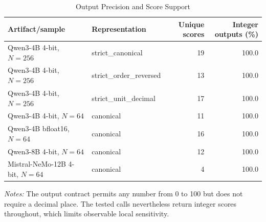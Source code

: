 \begin{table}[!htbp]\centering
\caption{Output Precision and Score Support}\label{tab:a_precision}
\begin{tabular}{llrr}\toprule
Artifact/sample & Representation & Unique scores & Integer outputs (\%) \\
\midrule
Qwen3-4B 4-bit, $N=256$ & strict\_canonical & 19 & 100.0 \\
Qwen3-4B 4-bit, $N=256$ & strict\_order\_reversed & 13 & 100.0 \\
Qwen3-4B 4-bit, $N=256$ & strict\_unit\_decimal & 17 & 100.0 \\
Qwen3-4B 4-bit, $N=64$ & canonical & 11 & 100.0 \\
Qwen3-4B bfloat16, $N=64$ & canonical & 16 & 100.0 \\
Qwen3-8B 4-bit, $N=64$ & canonical & 12 & 100.0 \\
Mistral-NeMo-12B 4-bit, $N=64$ & canonical & 4 & 100.0 \\
\bottomrule\end{tabular}
\begin{minipage}{0.92\textwidth}\footnotesize\textit{Notes:} The output contract permits any number from 0 to 100 but does not require a decimal place. The tested calls nevertheless return integer scores throughout, which limits observable local sensitivity.\end{minipage}
\end{table}
